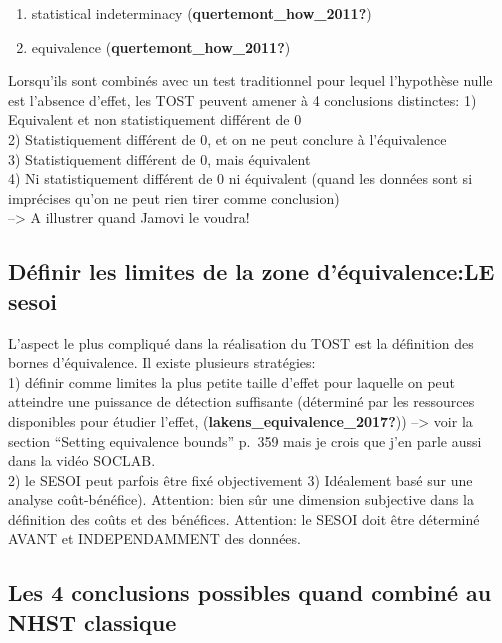 \documentclass[
  english,
  man]{apa6}
\providecommand{\tightlist}{%
  \setlength{\itemsep}{0pt}\setlength{\parskip}{0pt}}
\begin{document}
\begin{enumerate}
\def\labelenumi{\arabic{enumi})}
\tightlist
\item
  statistical indeterminacy (\textbf{quertemont\_how\_2011?})
\item
  equivalence (\textbf{quertemont\_how\_2011?})
\end{enumerate}

Lorsqu'ils sont combinés avec un test traditionnel pour lequel l'hypothèse nulle est l'absence d'effet, les TOST peuvent amener à 4 conclusions distinctes:
1) Equivalent et non statistiquement différent de 0\\
2) Statistiquement différent de 0, et on ne peut conclure à l'équivalence\\
3) Statistiquement différent de 0, mais équivalent\\
4) Ni statistiquement différent de 0 ni équivalent (quand les données sont si imprécises qu'on ne peut rien tirer comme conclusion)\\
--\textgreater{} A illustrer quand Jamovi le voudra!

\hypertarget{duxe9finir-les-limites-de-la-zone-duxe9quivalencele-sesoi}{%
\subsection{Définir les limites de la zone d'équivalence:LE sesoi}\label{duxe9finir-les-limites-de-la-zone-duxe9quivalencele-sesoi}}

L'aspect le plus compliqué dans la réalisation du TOST est la définition des bornes d'équivalence. Il existe plusieurs stratégies:\\
1) définir comme limites la plus petite taille d'effet pour laquelle on peut atteindre une puissance de détection suffisante (déterminé par les ressources disponibles pour étudier l'effet, (\textbf{lakens\_equivalence\_2017?})) --\textgreater{} voir la section ``Setting equivalence bounds'' p.~359 mais je crois que j'en parle aussi dans la vidéo SOCLAB.\\
2) le SESOI peut parfois être fixé objectivement
3) Idéalement basé sur une analyse coût-bénéfice). Attention: bien sûr une dimension subjective dans la définition des coûts et des bénéfices.
Attention: le SESOI doit être déterminé AVANT et INDEPENDAMMENT des données.

\hypertarget{les-4-conclusions-possibles-quand-combinuxe9-au-nhst-classique}{%
\subsection{Les 4 conclusions possibles quand combiné au NHST classique}\label{les-4-conclusions-possibles-quand-combinuxe9-au-nhst-classique}}
\end{document}

